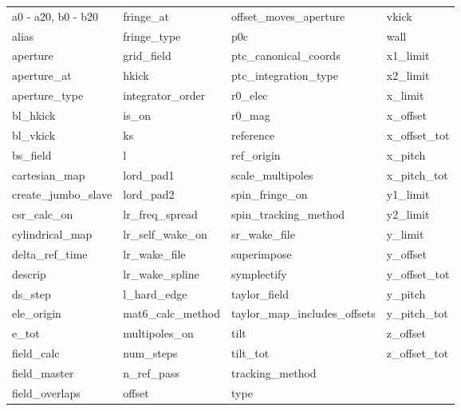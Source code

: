 \begin{tabular}{llll} \toprule
a0 - a20, b0 - b20          & fringe_at                   & offset_moves_aperture       & vkick                       \\
alias                       & fringe_type                 & p0c                         & wall                        \\
aperture                    & grid_field                  & ptc_canonical_coords        & x1_limit                    \\
aperture_at                 & hkick                       & ptc_integration_type        & x2_limit                    \\
aperture_type               & integrator_order            & r0_elec                     & x_limit                     \\
bl_hkick                    & is_on                       & r0_mag                      & x_offset                    \\
bl_vkick                    & ks                          & reference                   & x_offset_tot                \\
bs_field                    & l                           & ref_origin                  & x_pitch                     \\
cartesian_map               & lord_pad1                   & scale_multipoles            & x_pitch_tot                 \\
create_jumbo_slave          & lord_pad2                   & spin_fringe_on              & y1_limit                    \\
csr_calc_on                 & lr_freq_spread              & spin_tracking_method        & y2_limit                    \\
cylindrical_map             & lr_self_wake_on             & sr_wake_file                & y_limit                     \\
delta_ref_time              & lr_wake_file                & superimpose                 & y_offset                    \\
descrip                     & lr_wake_spline              & symplectify                 & y_offset_tot                \\
ds_step                     & l_hard_edge                 & taylor_field                & y_pitch                     \\
ele_origin                  & mat6_calc_method            & taylor_map_includes_offsets & y_pitch_tot                 \\
e_tot                       & multipoles_on               & tilt                        & z_offset                    \\
field_calc                  & num_steps                   & tilt_tot                    & z_offset_tot                \\
field_master                & n_ref_pass                  & tracking_method             &                             \\
field_overlaps              & offset                      & type                        &                             \\
 \bottomrule
 \end{tabular}
